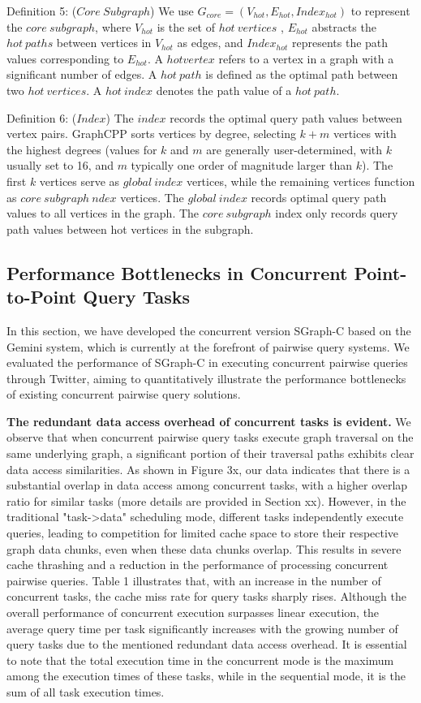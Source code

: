 \documentclass[lettersize,journal]{IEEEtran} %
\begin{document}
Definition 5: ($Core~Subgraph$) We use $G_{core}=(V_{hot},E_{hot},Index_{hot})$ to represent the $core~subgraph$, where $V_{hot}$ is the set of $hot~vertices$ , $E_{hot}$ abstracts the $hot~paths$ between vertices in $V_{hot}$ as edges, and $Index_{hot}$ represents the path values corresponding to $E_{hot}$. A $hot vertex$ refers to a vertex in a graph with a significant number of edges. A $hot~path$ is defined as the optimal path between two $hot~vertices$. A $hot~index$ denotes the path value of a $hot~path$.

Definition 6: ($Index$) The $index$ records the optimal query path values between vertex pairs. GraphCPP sorts vertices by degree, selecting $k+m$ vertices with the highest degrees (values for $k$ and $m$ are generally user-determined, with $k$ usually set to 16, and $m$ typically one order of magnitude larger than $k$). The first $k$ vertices serve as $global~index$ vertices, while the remaining vertices function as $core~subgraph~ndex$ vertices. The $global~index$ records optimal query path values to all vertices in the graph. The $core~subgraph$ index only records query path values between hot vertices in the subgraph.

\subsection{Performance Bottlenecks in Concurrent Point-to-Point Query Tasks}
In this section, we have developed the concurrent version SGraph-C based on the Gemini system, which is currently at the forefront of pairwise query systems. We evaluated the performance of SGraph-C in executing concurrent pairwise queries through Twitter, aiming to quantitatively illustrate the performance bottlenecks of existing concurrent pairwise query solutions.

{\bf{The redundant data access overhead of concurrent tasks is evident.}} We observe that when concurrent pairwise query tasks execute graph traversal on the same underlying graph, a significant portion of their traversal paths exhibits clear data access similarities. As shown in Figure 3x, our data indicates that there is a substantial overlap in data access among concurrent tasks, with a higher overlap ratio for similar tasks (more details are provided in Section xx). However, in the traditional "task->data" scheduling mode, different tasks independently execute queries, leading to competition for limited cache space to store their respective graph data chunks, even when these data chunks overlap. This results in severe cache thrashing and a reduction in the performance of processing concurrent pairwise queries. Table 1 illustrates that, with an increase in the number of concurrent tasks, the cache miss rate for query tasks sharply rises. Although the overall performance of concurrent execution surpasses linear execution, the average query time per task significantly increases with the growing number of query tasks due to the mentioned redundant data access overhead. It is essential to note that the total execution time in the concurrent mode is the maximum among the execution times of these tasks, while in the sequential mode, it is the sum of all task execution times.
\end{document}
